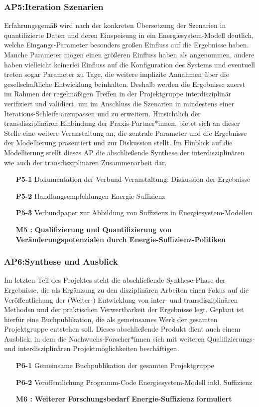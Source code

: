 \documentclass[a4paper,11pt,twoside]{scrartcl}
\begin{document}
\subsubsection*{AP5:Iteration Szenarien}
Erfahrungsgemäß wird nach der konkreten Übersetzung der Szenarien in quantifizierte Daten und deren Einspeisung in ein Energiesystem-Modell deutlich, welche Eingangs-Parameter besonders großen Einfluss auf die Ergebnisse haben. Manche Parameter mögen einen größeren Einfluss haben als angenommen, andere haben vielleicht keinerlei Einfluss auf die Konfiguration des Systems und eventuell treten sogar Parameter zu Tage, die weitere implizite Annahmen über die gesellschaftliche Entwicklung beinhalten. Deshalb werden die Ergebnisse zuerst im Rahmen der regelmäßigen Treffen in der Projektgruppe interdisziplinär verifiziert und validiert, um im Anschluss die Szenarien in mindestens einer Iterations-Schleife anzupassen und zu erweitern. Hinsichtlich der transdisziplinären Einbindung der Praxis-Partner*innen, bietet sich an dieser Stelle eine weitere Veranstaltung an, die zentrale Parameter und die Ergebnisse der Modellierung präsentiert und zur Diskussion stellt.
Im Hinblick auf die Modellierung stellt dieses AP die abschließende Synthese der interdisziplinären wie auch der transdisziplinären Zusammenarbeit dar.
\begin{itemize}
    \item[\textbf{P5-1}] Dokumentation der Verbund-Veranstaltung: Diskussion der Ergebnisse
    \item[\textbf{P5-2}] Handlungsempfehlungen Energie-Suffizienz
    \item[\textbf{P5-3}] Verbundpaper zur Abbildung von Suffizienz in Energiesystem-Modellen
    \item[\textbf{M5 :}] \textbf{Qualifizierung und Quantifizierung von Veränderungspotenzialen durch Energie-Suffizienz-Politiken}
\end{itemize}

\subsubsection*{AP6:Synthese und Ausblick}
Im letzten Teil des Projektes steht die abschließende Synthese-Phase der Ergebnisse, die als Ergänzung zu den disziplinären Arbeiten einen Fokus auf die Veröffentlichung der (Weiter-) Entwicklung von inter- und transdisziplinären Methoden und der praktischen Verwertbarkeit der Ergebnisse legt.
Geplant ist hierfür eine Buchpublikation, die als gemeinsames Werk der gesamten Projektgruppe entstehen soll. Dieses abschließende Produkt dient auch einem Ausblick, in dem die Nachwuchs-Forscher*innen sich mit weiteren Qualifizierungs- und interdisziplinären Projektmöglichkeiten beschäftigen.
\begin{itemize}
    \item[\textbf{P6-1}] Gemeinsame Buchpublikation der gesamten Projektgruppe
    \item[\textbf{P6-2}] Veröffentlichung Programm-Code Energiesystem-Modell inkl. Suffizienz
    \item[\textbf{M6 :}] \textbf{Weiterer Forschungsbedarf Energie-Suffizienz formuliert}
\end{itemize}
\end{document}

